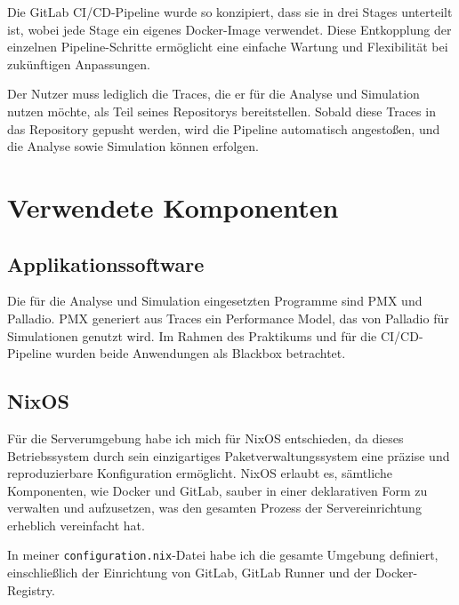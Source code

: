 Die GitLab CI/CD-Pipeline wurde so konzipiert, dass sie in drei Stages unterteilt ist, wobei jede Stage ein eigenes Docker-Image verwendet. Diese Entkopplung der einzelnen Pipeline-Schritte ermöglicht eine einfache Wartung und Flexibilität bei zukünftigen Anpassungen.

Der Nutzer muss lediglich die Traces, die er für die Analyse und Simulation nutzen möchte, als Teil seines Repositorys bereitstellen. Sobald diese Traces in das Repository gepusht werden, wird die Pipeline automatisch angestoßen, und die Analyse sowie Simulation können erfolgen.


\section{Verwendete Komponenten}
\subsection{Applikationssoftware}
Die für die Analyse und Simulation eingesetzten Programme sind PMX und Palladio. PMX generiert aus Traces ein Performance Model, das von Palladio für Simulationen genutzt wird. Im Rahmen des Praktikums und für die CI/CD-Pipeline wurden beide Anwendungen als Blackbox betrachtet.

\subsection{NixOS} 
Für die Serverumgebung habe ich mich für NixOS entschieden, da dieses Betriebssystem durch sein einzigartiges Paketverwaltungssystem eine präzise und reproduzierbare Konfiguration ermöglicht. NixOS erlaubt es, sämtliche Komponenten, wie Docker und GitLab, sauber in einer deklarativen Form zu verwalten und aufzusetzen, was den gesamten Prozess der Servereinrichtung erheblich vereinfacht hat.

In meiner \texttt{configuration.nix}-Datei habe ich die gesamte Umgebung definiert, einschließlich der Einrichtung von GitLab, GitLab Runner und der Docker-Registry. 

